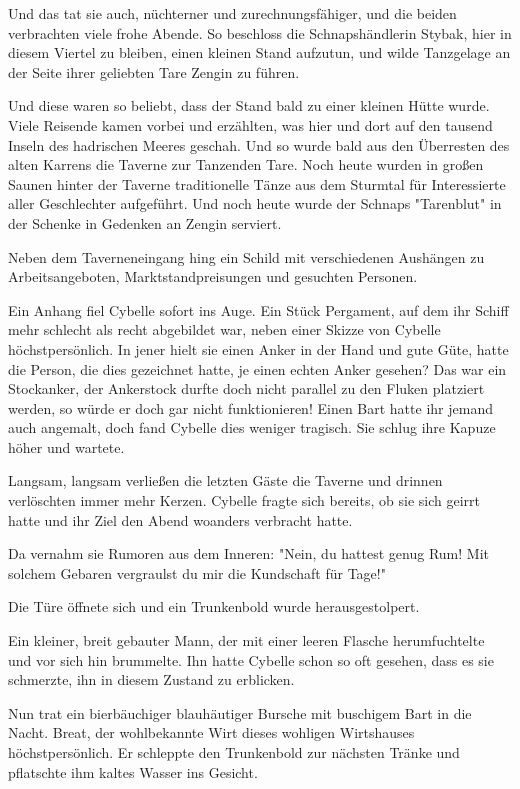 Und das tat sie auch, nüchterner und zurechnungsfähiger, und die beiden verbrachten viele frohe Abende. So beschloss die Schnapshändlerin Stybak, hier in diesem Viertel zu bleiben, einen kleinen Stand aufzutun, und wilde Tanzgelage an der Seite ihrer geliebten Tare Zengin zu führen.

Und diese waren so beliebt, dass der Stand bald zu einer kleinen Hütte wurde. Viele Reisende kamen vorbei und erzählten, was hier und dort auf den tausend Inseln des hadrischen Meeres geschah. Und so wurde bald aus den Überresten des alten Karrens die Taverne zur Tanzenden Tare. Noch heute wurden in großen Saunen hinter der Taverne traditionelle Tänze aus dem Sturmtal für Interessierte aller Geschlechter aufgeführt. Und noch heute wurde der Schnaps "Tarenblut" in der Schenke in Gedenken an Zengin serviert.

\trennzeichen

Neben dem Taverneneingang hing ein Schild mit verschiedenen Aushängen zu Arbeitsangeboten, Marktstandpreisungen und gesuchten Personen.

Ein Anhang fiel Cybelle sofort ins Auge. Ein Stück Pergament, auf dem ihr Schiff mehr schlecht als recht abgebildet war, neben einer Skizze von Cybelle höchstpersönlich. In jener hielt sie einen Anker in der Hand und gute Güte, hatte die Person, die dies gezeichnet hatte, je einen echten Anker gesehen? Das war ein Stockanker, der Ankerstock durfte doch nicht parallel zu den Fluken platziert werden, so würde er doch gar nicht funktionieren! Einen Bart hatte ihr jemand auch angemalt, doch fand Cybelle dies weniger tragisch. Sie schlug ihre Kapuze höher und wartete.

Langsam, langsam verließen die letzten Gäste die Taverne und drinnen verlöschten immer mehr Kerzen. Cybelle fragte sich bereits, ob sie sich geirrt hatte und ihr Ziel den Abend woanders verbracht hatte.

Da vernahm sie Rumoren aus dem Inneren: "Nein, du hattest genug Rum! Mit solchem Gebaren vergraulst du mir die Kundschaft für Tage!"

Die Türe öffnete sich und ein Trunkenbold wurde herausgestolpert.

Ein kleiner, breit gebauter Mann, der mit einer leeren Flasche herumfuchtelte und vor sich hin brummelte. Ihn hatte Cybelle schon so oft gesehen, dass es sie schmerzte, ihn in diesem Zustand zu erblicken.

Nun trat ein bierbäuchiger blauhäutiger Bursche mit buschigem Bart in die Nacht. Breat, der wohlbekannte Wirt dieses wohligen Wirtshauses höchstpersönlich. Er schleppte den Trunkenbold zur nächsten Tränke und pflatschte ihm kaltes Wasser ins Gesicht. 

